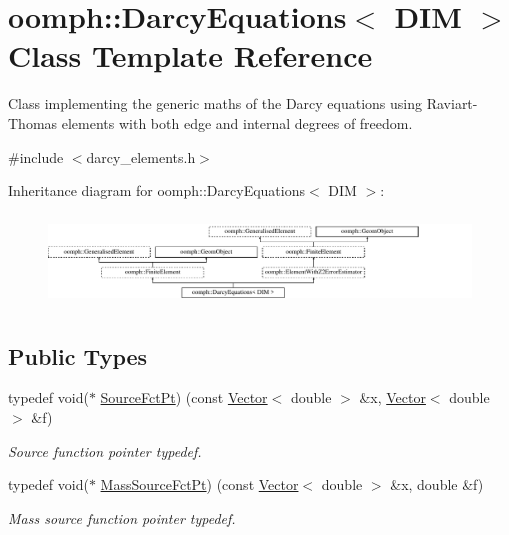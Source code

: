 \hypertarget{classoomph_1_1DarcyEquations}{}\section{oomph\+:\+:Darcy\+Equations$<$ D\+IM $>$ Class Template Reference}
\label{classoomph_1_1DarcyEquations}


Class implementing the generic maths of the Darcy equations using Raviart-\/\+Thomas elements with both edge and internal degrees of freedom.  




{\ttfamily \#include $<$darcy\+\_\+elements.\+h$>$}

Inheritance diagram for oomph\+:\+:Darcy\+Equations$<$ D\+IM $>$\+:\begin{figure}[H]
\begin{center}
\leavevmode
\includegraphics[height=2.456141cm]{classoomph_1_1DarcyEquations}
\end{center}
\end{figure}
\subsection*{Public Types}
\begin{DoxyCompactItemize}
\item 
typedef void($\ast$ \hyperlink{classoomph_1_1DarcyEquations_adcf88d9573b0f1c1988bdae6234eb7f8}{Source\+Fct\+Pt}) (const \hyperlink{classoomph_1_1Vector}{Vector}$<$ double $>$ \&x, \hyperlink{classoomph_1_1Vector}{Vector}$<$ double $>$ \&f)
\begin{DoxyCompactList}\small\item\em Source function pointer typedef. \end{DoxyCompactList}\item 
typedef void($\ast$ \hyperlink{classoomph_1_1DarcyEquations_abb20685508a2704d195f3b8e124d20b4}{Mass\+Source\+Fct\+Pt}) (const \hyperlink{classoomph_1_1Vector}{Vector}$<$ double $>$ \&x, double \&f)
\begin{DoxyCompactList}\small\item\em Mass source function pointer typedef. \end{DoxyCompactList}\end{DoxyCompactItemize}
